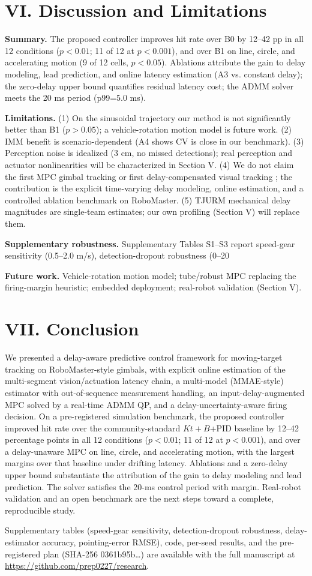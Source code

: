 \documentclass[journal]{IEEEtran}
\begin{document}
\section*{VI. Discussion and Limitations}
\textbf{Summary.} The proposed controller improves hit rate over B0 by 12--42 pp in all 12 conditions ($p<0.01$; 11 of 12 at $p<0.001$), and over B1 on line, circle, and accelerating motion (9 of 12 cells, $p<0.05$). Ablations attribute the gain to delay modeling, lead prediction, and online latency estimation (A3 vs. constant delay); the zero-delay upper bound quantifies residual latency cost; the ADMM solver meets the 20 ms period (p99=5.0 ms).

\textbf{Limitations.} (1) On the sinusoidal trajectory our method is not significantly better than B1 ($p>0.05$); a vehicle-rotation motion model is future work. (2) IMM benefit is scenario-dependent (A4 shows CV is close in our benchmark). (3) Perception noise is idealized (3 cm, no missed detections); real perception and actuator nonlinearities will be characterized in Section V. (4) We do not claim the first MPC gimbal tracking \cite{ref3} or first delay-compensated visual tracking \cite{ref5}\cite{ref6}; the contribution is the explicit time-varying delay modeling, online estimation, and a controlled ablation benchmark on RoboMaster. (5) TJURM mechanical delay magnitudes are single-team estimates; our own profiling (Section V) will replace them.

\textbf{Supplementary robustness.} Supplementary Tables S1--S3 report speed-gear sensitivity (0.5--2.0 m/s), detection-dropout robustness (0--20%

\textbf{Future work.} Vehicle-rotation motion model; tube/robust MPC replacing the firing-margin heuristic; embedded deployment; real-robot validation (Section V).
\section*{VII. Conclusion}

We presented a delay-aware predictive control framework for moving-target tracking on RoboMaster-style gimbals, with explicit online estimation of the multi-segment vision/actuation latency chain, a multi-model (MMAE-style) estimator with out-of-sequence measurement handling, an input-delay-augmented MPC solved by a real-time ADMM QP, and a delay-uncertainty-aware firing decision. On a pre-registered simulation benchmark, the proposed controller improved hit rate over the community-standard $Kt+B$+PID baseline by 12--42 percentage points in all 12 conditions ($p<0.01$; 11 of 12 at $p<0.001$), and over a delay-unaware MPC on line, circle, and accelerating motion, with the largest margins over that baseline under drifting latency. Ablations and a zero-delay upper bound substantiate the attribution of the gain to delay modeling and lead prediction. The solver satisfies the 20-ms control period with margin. Real-robot validation and an open benchmark are the next steps toward a complete, reproducible study.



Supplementary tables (speed-gear sensitivity, detection-dropout robustness, delay-estimator accuracy, pointing-error RMSE), code, per-seed results, and the pre-registered plan (SHA-256 0361b95b\ldots) are available with the full manuscript at \url{https://github.com/prep0227/research}.
\end{document}
